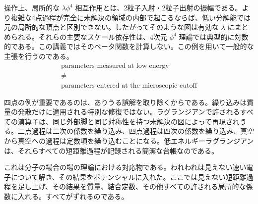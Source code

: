 操作上、局所的な \(\lambda\phi^4\) 相互作用とは、2粒子入射・2粒子出射の振幅である。より複雑な4点過程が完全に未解決の領域の内部で起こるならば、低い分解能では元の局所的な頂点と区別できない。したがってそのような図は有効な \(\lambda\) にまとめられる。それらの主要なスケール依存性は、4次元 \(\phi^4\) 理論では典型的に対数的である。この講義ではそのベータ関数を計算しない。この例を用いて一般的な主張を行うのである。
\begin{equation}
\begin{gathered}
\text{parameters measured at low energy}\\
\ne\\
\text{parameters entered at the microscopic cutoff}
\end{gathered}
\end{equation}

四点の例が重要であるのは、ありうる誤解を取り除くからである。繰り込みは質量の発散だけに適用される特別な修復ではない。ラグランジアンで許されるすべての演算子は、同じ外部脚と同じ対称性を持つ未解決の図によって再現されうる。二点過程は二次の係数を繰り込み、四点過程は四次の係数を繰り込み、真空から真空への過程は定数項を繰り込むことになる。低エネルギーラグランジアンは、それらすべての短距離過程が記録される簡潔な台帳なのである。

\begin{classroomqa}
\end{classroomqa}

これは分子の場合の場の理論における対応物である。われわれは見えない速い電子について解き、その結果をポテンシャルに入れた。ここでは見えない短距離過程を足し上げ、その結果を質量、結合定数、その他すべての許される局所的な係数に入れる。すべてがずれるのである。

\begin{classroomqa}
\end{classroomqa}

